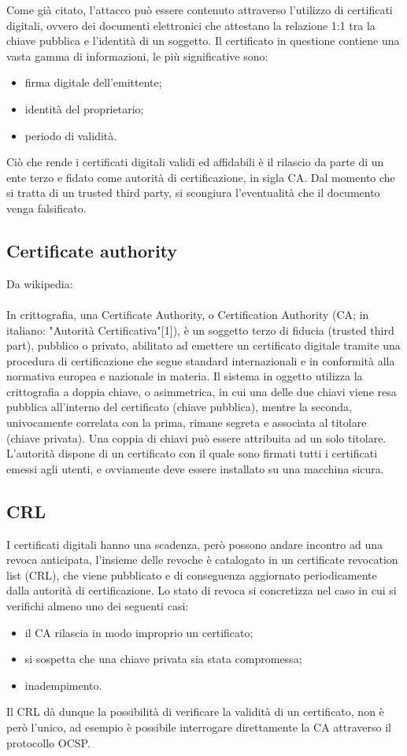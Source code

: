 Come già citato, l'attacco può essere contenuto attraverso l'utilizzo di certificati digitali, ovvero dei documenti elettronici che attestano la relazione 1:1 tra la chiave pubblica e l'identità di un soggetto. Il certificato in questione contiene una vasta gamma di informazioni, le più significative sono: 
\begin{itemize}
	\item firma digitale dell'emittente;
	\item identità del proprietario;
	\item periodo di validità.
\end{itemize}
Ciò che rende i certificati digitali validi ed affidabili è il rilascio da parte di un ente terzo e fidato come autorità di certificazione, in sigla CA. Dal momento che si tratta di un trusted third party, si scongiura l'eventualità che il documento venga falsificato.

\subsection{Certificate authority}
Da wikipedia: \\\\
In crittografia, una Certificate Authority, o Certification Authority (CA; in italiano: "Autorità Certificativa"[1]), è un soggetto terzo di fiducia (trusted third part), pubblico o privato, abilitato ad emettere un certificato digitale tramite una procedura di certificazione che segue standard internazionali e in conformità alla normativa europea e nazionale in materia.
Il sistema in oggetto utilizza la crittografia a doppia chiave, o asimmetrica, in cui una delle due chiavi viene resa pubblica all'interno del certificato (chiave pubblica), mentre la seconda, univocamente correlata con la prima, rimane segreta e associata al titolare (chiave privata). Una coppia di chiavi può essere attribuita ad un solo titolare. L'autorità dispone di un certificato con il quale sono firmati tutti i certificati emessi agli utenti, e ovviamente deve essere installato su una macchina sicura.

\subsection{CRL}

I certificati digitali hanno una scadenza, però possono andare incontro ad una revoca anticipata, l'insieme delle revoche è catalogato in un certificate revocation list (CRL), che viene pubblicato e di conseguenza aggiornato periodicamente dalla autorità di certificazione. Lo stato di revoca si concretizza nel caso in cui si verifichi almeno uno dei seguenti casi:
\begin{itemize}
	\item il CA rilascia in modo improprio un certificato;
	\item si sospetta che una chiave privata sia stata compromessa;
	\item inadempimento.
\end{itemize}
Il CRL dà dunque la possibilità di verificare la validità di un certificato, non è però l'unico, ad esempio è possibile interrogare direttamente la CA attraverso il protocollo OCSP.
